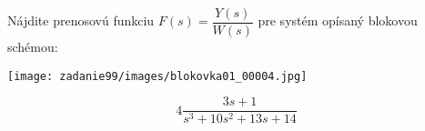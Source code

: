 \documentclass{article}
\begin{document}
\begin{task}

    Nájdite prenosovú funkciu $F(s)=\dfrac{Y(s)}{W(s)}$ pre systém opísaný blokovou schémou: 

    \texttt{[image: zadanie99/images/blokovka01\_00004.jpg]} 

\end{task}
\begin{equation*}

        4\dfrac{3s+1}{s^3+10s^2+13s+14}
    
\end{equation*}
\end{document}
